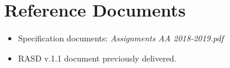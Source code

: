 \section{Reference Documents}
\begin{itemize}

\item Specification documents: \emph{Assignments AA 2018-2019.pdf}
\item RASD v.1.1 document previously delivered.

\end{itemize}